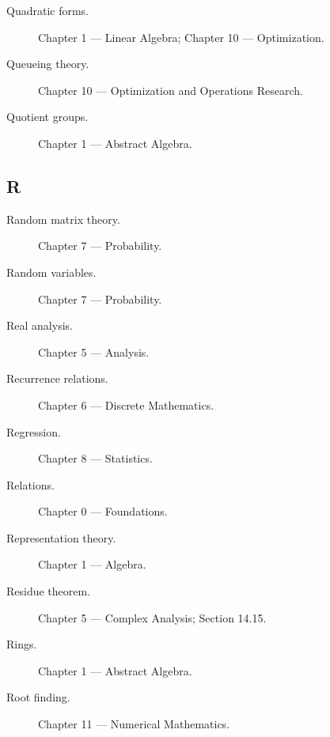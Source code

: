 \begin{description}

\item[Quadratic forms.]
Chapter 1 --- Linear Algebra;
Chapter 10 --- Optimization.

\item[Queueing theory.]
Chapter 10 --- Optimization and Operations Research.

\item[Quotient groups.]
Chapter 1 --- Abstract Algebra.

\end{description}

\subsection*{R}

\begin{description}

\item[Random matrix theory.]
Chapter 7 --- Probability.

\item[Random variables.]
Chapter 7 --- Probability.

\item[Real analysis.]
Chapter 5 --- Analysis.

\item[Recurrence relations.]
Chapter 6 --- Discrete Mathematics.

\item[Regression.]
Chapter 8 --- Statistics.

\item[Relations.]
Chapter 0 --- Foundations.

\item[Representation theory.]
Chapter 1 --- Algebra.

\item[Residue theorem.]
Chapter 5 --- Complex Analysis;
Section 14.15.

\item[Rings.]
Chapter 1 --- Abstract Algebra.

\item[Root finding.]
Chapter 11 --- Numerical Mathematics.

\end{description}

